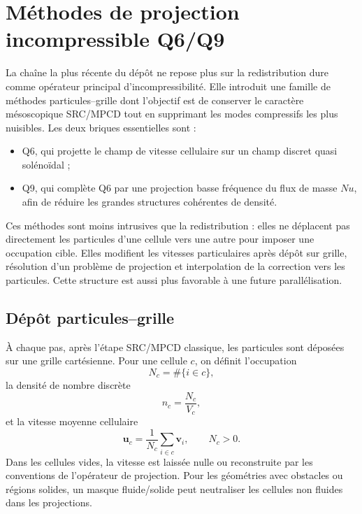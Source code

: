 \documentclass[11pt,a4paper]{article}
\begin{document}
\section{Méthodes de projection incompressible Q6/Q9}

La chaîne la plus récente du dépôt ne repose plus sur la redistribution dure comme opérateur principal d'incompressibilité. Elle introduit une famille de méthodes particules--grille dont l'objectif est de conserver le caractère mésoscopique SRC/MPCD tout en supprimant les modes compressifs les plus nuisibles. Les deux briques essentielles sont :
\begin{itemize}
  \item Q6, qui projette le champ de vitesse cellulaire sur un champ discret quasi solénoïdal ;
  \item Q9, qui complète Q6 par une projection basse fréquence du flux de masse $Nu$, afin de réduire les grandes structures cohérentes de densité.
\end{itemize}

Ces méthodes sont moins intrusives que la redistribution : elles ne déplacent pas directement les particules d'une cellule vers une autre pour imposer une occupation cible. Elles modifient les vitesses particulaires après dépôt sur grille, résolution d'un problème de projection et interpolation de la correction vers les particules. Cette structure est aussi plus favorable à une future parallélisation.

\subsection{Dépôt particules--grille}

À chaque pas, après l'étape SRC/MPCD classique, les particules sont déposées sur une grille cartésienne. Pour une cellule $c$, on définit l'occupation
\begin{equation}
  N_c = \#\{i\in c\},
\end{equation}
la densité de nombre discrète
\begin{equation}
  n_c = \frac{N_c}{V_c},
\end{equation}
et la vitesse moyenne cellulaire
\begin{equation}
  \bm{u}_c = \frac{1}{N_c}\sum_{i\in c}\bm{v}_i,
  \qquad N_c>0.
\end{equation}
Dans les cellules vides, la vitesse est laissée nulle ou reconstruite par les conventions de l'opérateur de projection. Pour les géométries avec obstacles ou régions solides, un masque fluide/solide peut neutraliser les cellules non fluides dans les projections.
\end{document}
